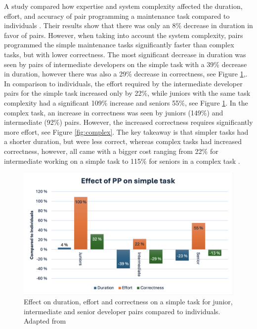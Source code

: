 \documentclass[conference]{IEEEtran}
\begin{document}
A study compared how expertise and system complexity affected the duration, effort, and accuracy of pair programming a maintenance task compared to individuals \cite{Arisholm2007Evaluating}. Their results show that there was only an 8\% decrease in duration in favor of pairs. However, when taking into account the system complexity, pairs programmed the simple maintenance tasks significantly faster than complex tasks, but with lower correctness. The most significant decrease in duration was seen by pairs of intermediate developers on the simple task with a 39\% decrease in duration, however there was also a 29\% decrease in correctness, see Figure \ref{fig:simple},. In comparison to individuals, the effort required by the intermediate developer pairs for the simple task increased only by 22\%, while juniors with the same task complexity had a significant 109\% increase and seniors 55\%, see Figure \ref{fig:simple}. In the complex task, an increase in correctness was seen by juniors (149\%) and intermediate (92\%) pairs. However, the increased correctness requires significantly more effort, see Figure \ref{fig:complex}. The key takeaway is that simpler tasks had a shorter duration, but were less correct, whereas complex tasks had increased correctness, however, all came with a bigger cost ranging from 22\% for intermediate working on a simple task to 115\% for seniors in a complex task \cite{Arisholm2007Evaluating}.


\begin{figure}
    \centering
    \includegraphics[width=\linewidth]{simple.png}
    \caption{Effect on duration, effort and correctness on a simple task for junior, intermediate and senior developer pairs compared to individuals. Adapted from \cite{Arisholm2007Evaluating}}
    \label{fig:simple}
\end{figure}
\end{document}
